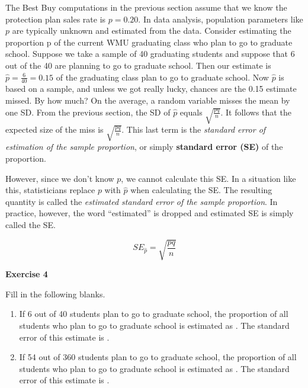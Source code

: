 \documentclass[11pt, chapterprefix=true]{scrbook}\usepackage[]{graphicx}\usepackage[]{color}
\begin{document}
The Best Buy computations in the previous section assume that we know the protection plan sales rate is $p = 0.20$.  In data analysis, population parameters like $p$ are typically unknown and estimated from the data.  Consider estimating the proportion p of the current WMU graduating class who plan to go to graduate school.  Suppose we take a sample of 40 graduating students and suppose that 6 out of the 40 are planning to go to graduate school.  Then our estimate is $\hat{p} = \frac{6}{40} = 0.15$ of the graduating class plan to go to graduate school.  Now $\hat{p}$ is based on a sample, and unless we got really lucky, chances are the 0.15 estimate missed.  By how much?  On the average, a random variable misses the mean by one SD.  From the previous section, the SD of $\hat{p}$  equals $\sqrt{ \frac{pq}{n}}$.   It follows that the expected size of the miss is $\sqrt{ \frac{pq}{n}}$.   This last term is the \textit{standard error of estimation of the sample proportion}, or simply \textbf{standard error (SE)} of the proportion.

However, since we don't know $p$, we cannot calculate this SE.  In a situation like this, statisticians replace $p$ with $\hat{p}$  when calculating the SE.  The resulting quantity is called the \textit{estimated standard error of the sample proportion}.  In practice, however, the word ``estimated'' is dropped and estimated SE is simply called the SE.


\begin{equation*}
SE_{\hat{p}} = \sqrt{\frac{pq}{n}}
\end{equation*}

\begin{minipage}[ht]{3cm}

\vspace{-40mm}

\textbf{Exercise 4}
\end{minipage}
\begin{minipage}[ht]{11cm}

\parbox{11cm}{

Fill in the following blanks.

\begin{enumerate}
\item If 6 out of 40 students plan to go to graduate school, the proportion of all students who plan to go to graduate school is estimated as \underline{\phantom{xxxxxxx}}.  The standard error of this estimate is \underline{\phantom{xxxxxxx}}.
\item If 54 out of 360 students plan to go to graduate school, the proportion of all students who plan to go to graduate school is estimated as \underline{\phantom{xxxxxxx}}.  The standard error of this estimate is \underline{\phantom{xxxxxxx}}.
\end{enumerate}

}
\end{minipage}
\end{document}
